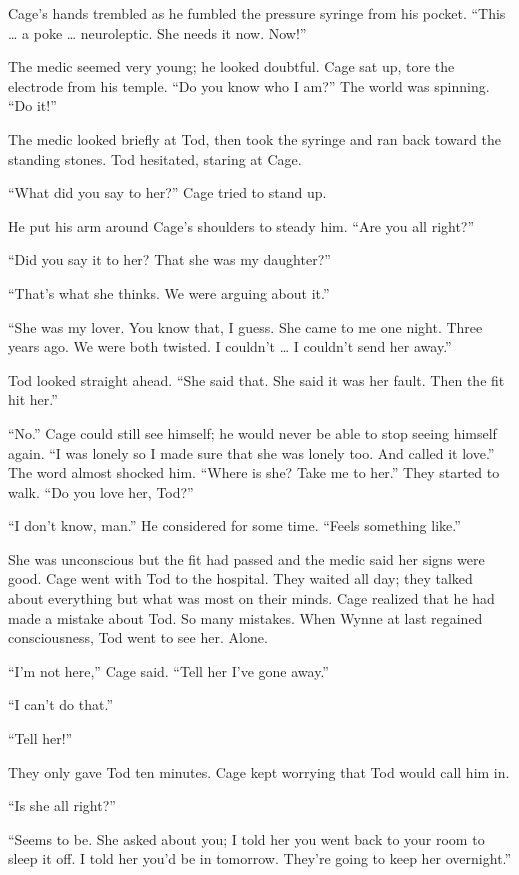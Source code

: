 Cage's hands trembled as he fumbled the pressure syringe from his pocket. ``This … a poke … neuroleptic. She needs it now. Now!''

The medic seemed very young; he looked doubtful. Cage sat up, tore the electrode from his temple. ``Do you know who I am?'' The world was spinning. ``Do it!''

The medic looked briefly at Tod, then took the syringe and ran back toward the standing stones. Tod hesitated, staring at Cage.

``What did you say to her?'' Cage tried to stand up.

He put his arm around Cage's shoulders to steady him. ``Are you all right?''

``Did you say it to her? That she was my daughter?''

``That's what she thinks. We were arguing about it.''

``She was my lover. You know that, I guess. She came to me one night. Three years ago. We were both twisted. I couldn't … I couldn't send her away.''

Tod looked straight ahead. ``She said that. She said it was her fault. Then the fit hit her.''

``No.'' Cage could still see himself; he would never be able to stop seeing himself again. ``I was lonely so I made sure that she was lonely too. And called it love.'' The word almost shocked him. ``Where is she? Take me to her.'' They started to walk. ``Do you love her, Tod?''

``I don't know, man.'' He considered for some time. ``Feels something like.''

She was unconscious but the fit had passed and the medic said her signs were good. Cage went with Tod to the hospital. They waited all day; they talked about everything but what was most on their minds. Cage realized that he had made a mistake about Tod. So many mistakes. When Wynne at last regained consciousness, Tod went to see her. Alone.

``I'm not here,'' Cage said. ``Tell her I've gone away.''

``I can't do that.''

``Tell her!''

They only gave Tod ten minutes. Cage kept worrying that Tod would call him in.

``Is she all right?''

``Seems to be. She asked about you; I told her you went back to your room to sleep it off. I told her you'd be in tomorrow. They're going to keep her overnight.''

